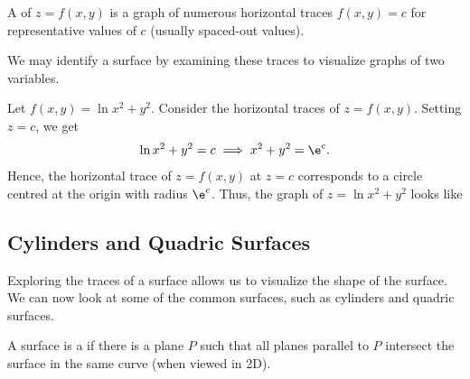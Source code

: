 \begin{definition}
    A  of $z = f(x, y)$ is a graph of numerous horizontal traces $f(x, y) = c$ for representative values of $c$ (usually spaced-out values).
\end{definition}

We may identify a surface by examining these traces to visualize graphs of two variables.

\begin{example}[Graph of $z = f(x, y)$]
    Let $f(x, y) = \ln{x^2 + y^2}$. Consider the horizontal traces of $z = f(x, y)$. Setting $z = c$, we get \[\ln{x^2 + y^2} = c \implies x^2 + y^2 = \e^c.\] Hence, the horizontal trace of $z = f(x, y)$ at $z = c$ corresponds to a circle centred at the origin with radius $\e^c$. Thus, the graph of $z = \ln{x^2 + y^2}$ looks like

    \begin{figure}[H]
        \centering
        \caption{}
    \end{figure}
\end{example}

\subsection{Cylinders and Quadric Surfaces}

Exploring the traces of a surface allows us to visualize the shape of the surface. We can now look at some of the common surfaces, such as cylinders and quadric surfaces.

\begin{definition}
    A surface is a  if there is a plane $P$ such that all planes parallel to $P$ intersect the surface in the same curve (when viewed in 2D).
\end{definition}

